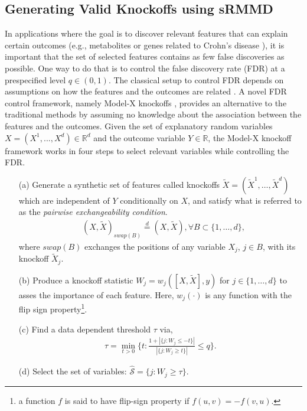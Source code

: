 \documentclass{article}
\theoremstyle{definition}
\begin{document}
\subsection{Generating Valid Knockoffs using sRMMD}
In applications where the goal is to discover relevant features that can explain certain outcomes (e.g., metabolites or genes related to Crohn's disease \cite{lloyd2019multi, franke2010genome}), it is important that the set of selected features contains as few false discoveries as possible. One way to do that is to control the false discovery rate (FDR) at a prespecified level $q\in(0, 1)$. The classical setup to control FDR depends on assumptions on how the features and the outcomes are related \cite{benjamini1995controlling, gavrilov2009adaptive}. A novel FDR control framework, namely Model-X knockoffs \cite{candes2016panning}, provides an alternative to the traditional methods by assuming no knowledge about the association between the features and the outcomes. Given the set of explanatory random variables $X =(X^1,...,X^d)\in \mathbb R^d$ and the outcome variable $Y\in \mathbb R$, the Model-X knockoff framework works in four steps to select relevant variables while controlling the FDR. 
\begin{itemize}
    \item[(a)] Generate a synthetic set of features called knockoffs $\tilde X =(\tilde X^1, \dots, \tilde X^d)$ which are independent of $Y$ conditionally on $X$, and satisfy what is referred to as the \emph{pairwise exchangeability condition}.
\begin{align}
    & (  X, \tilde{  X})_{swap(B)} \overset{d}{=} (  X, \tilde {  X}), \forall B\subset \{1, \dots, d\}, \label{eq:exchangeability}
\end{align}
where $swap(B)$ exchanges the positions of any variable $X_j$, $j\in B$, with its knockoff $\tilde X_j$.
    \item [(b)] Produce a knockoff statistic $W_j = w_j([ X, \tilde{ X}], y)$ for $j\in\{1, \dots, d\}$ to asses the importance of each feature. Here, $w_j(\cdot)$ is any function with the flip sign property\footnote{a function $f$ is said to have flip-sign property if $f(u, v)= -f(v, u)$.}.
    \item [(c)] Find a data dependent threshold $\tau$ via,
\begin{align}  \label{eq:threshold}
    \tau = \min_{t>0}\Big \{t: \frac{1+ |\{j: W_j \leq -t\}|}{|\{j: W_j \geq t\}|}\leq q\Big \}.
\end{align}
\item[(d)] Select the set of variables: $\hat{\mathcal S} = \{j: W_j\geq \tau\}$.
\end{itemize}
\end{document}
